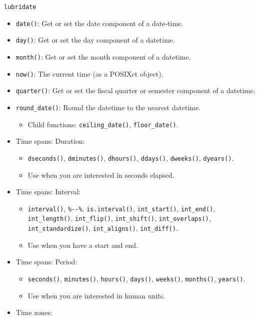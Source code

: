 \documentclass[]{book}
\providecommand{\tightlist}{%
  \setlength{\itemsep}{0pt}\setlength{\parskip}{0pt}}
\begin{document}
\texttt{lubridate}

\begin{itemize}
\tightlist
\item
  \texttt{date()}: Get or set the date component of a date-time.
\item
  \texttt{day()}: Get or set the day component of a datetime.
\item
  \texttt{month()}: Get or set the month component of a datetime.
\item
  \texttt{now()}: The current time (as a POSIXct object).
\item
  \texttt{quarter()}: Get or set the fiscal quarter or semester component of a datetime.
\item
  \texttt{round\_date()}: Round the datetime to the nearest datetime.

  \begin{itemize}
  \tightlist
  \item
    Child functions: \texttt{ceiling\_date()}, \texttt{floor\_date()}.
  \end{itemize}
\item
  Time spans: Duration:

  \begin{itemize}
  \tightlist
  \item
    \texttt{dseconds()}, \texttt{dminutes()}, \texttt{dhours()}, \texttt{ddays()}, \texttt{dweeks()}, \texttt{dyears()}.
  \item
    Use when you are interested in seconds elapsed.
  \end{itemize}
\item
  Time spans: Interval:

  \begin{itemize}
  \tightlist
  \item
    \texttt{interval()}, \texttt{\%-\/-\%}, \texttt{is.interval()}, \texttt{int\_start()}, \texttt{int\_end()}, \texttt{int\_length()}, \texttt{int\_flip()}, \texttt{int\_shift()}, \texttt{int\_overlaps()}, \texttt{int\_standardize()}, \texttt{int\_aligns()}, \texttt{int\_diff()}.
  \item
    Use when you have a start and end.
  \end{itemize}
\item
  Time spans: Period:

  \begin{itemize}
  \tightlist
  \item
    \texttt{seconds()}, \texttt{minutes()}, \texttt{hours()}, \texttt{days()}, \texttt{weeks()}, \texttt{months()}, \texttt{years()}.
  \item
    Use when you are interested in human units.
  \end{itemize}
\item
  Time zones:


\end{itemize}
\end{document}
